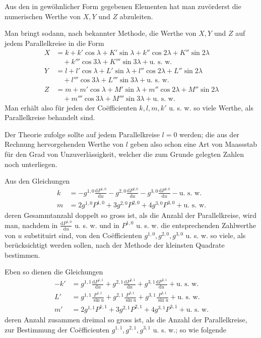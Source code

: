 Aus den in gewöhnlicher Form gegebenen Elementen hat man zuvörderst die numerischen Werthe von $X,Y$ und $Z$ abzuleiten.

Man bringt sodann, nach bekannter Methode, die Werthe von $X,Y$ und $Z$ auf jedem Parallelkreise in die Form
\[
\begin{aligned}
X&=k+k'\cos\lambda+K'\sin\lambda+k''\cos2\lambda+K''\sin2\lambda\\&\quad+k'''\cos3\lambda+K'''\sin3\lambda+\text{u. s. w.}\\
Y&=l+l'\cos\lambda+L'\sin\lambda+l''\cos2\lambda+L''\sin2\lambda\\&\quad+l'''\cos3\lambda+L'''\sin3\lambda+\text{u. s. w.}\\
Z&=m+m'\cos\lambda+M'\sin\lambda+m''\cos2\lambda+M''\sin2\lambda\\&\quad+m'''\cos3\lambda+M'''\sin3\lambda+\text{u. s. w.}
\end{aligned}
\]
Man erhält also für jeden der Coëfficienten $k,l,m,k'$ u. s. w. so viele Werthe, als Parallelkreise behandelt sind.

Der Theorie zufolge sollte auf jedem Parallelkreise $l=0$ werden; die aus der Rechnung hervorgehenden Werthe von $l$ geben also schon eine Art von Maassstab für den Grad von Unzuverlässigkeit, welcher die zum Grunde gelegten Zahlen noch unterliegen.

Aus den Gleichungen
\[
\begin{aligned}
k&=-g^{1,0}\frac{\mathrm{d}P^{1,0}}{\mathrm{d}u}-g^{2,0}\frac{\mathrm{d}P^{2,0}}{\mathrm{d}u}-g^{3,0}\frac{\mathrm{d}P^{3,0}}{\mathrm{d}u}-\text{u. s. w.}\\
m&=2g^{1,0}P^{1,0}+3g^{2,0}P^{2,0}+4g^{3,0}P^{3,0}+\text{u. s. w.}
\end{aligned}
\]
deren Gesammtanzahl doppelt so gross ist, als die Anzahl der Parallelkreise, wird man, nachdem in $\frac{\mathrm{d}P^{1,0}}{\mathrm{d}u}$ u. s. w. und in $P^{1,0}$ u. s. w. die entsprechenden Zahlwerthe von $u$ substituirt sind, von den Coëfficienten $g^{1,0},g^{2,0},g^{3,0}$ u. s. w. so viele, als berücksichtigt werden sollen, nach der Methode der kleinsten Quadrate bestimmen.

Eben so dienen die Gleichungen
\[
\begin{aligned}
-k'&=g^{1,1}\frac{\mathrm{d}P^{1,1}}{\mathrm{d}u}+g^{2,1}\frac{\mathrm{d}P^{2,1}}{\mathrm{d}u}+g^{3,1}\frac{\mathrm{d}P^{3,1}}{\mathrm{d}u}+\text{u. s. w.}\\
L'&=g^{1,1}\frac{P^{1,1}}{\sin u}+g^{2,1}\frac{P^{2,1}}{\sin u}+g^{3,1}\frac{P^{3,1}}{\sin u}+\text{u. s. w.}\\
m'&=2g^{1,1}P^{1,1}+3g^{2,1}P^{2,1}+4g^{3,1}P^{3,1}+\text{u. s. w.}
\end{aligned}
\]
deren Anzahl zusammen dreimal so gross ist, als die Anzahl der Parallelkreise, zur Bestimmung der Coëfficienten $g^{1,1},g^{2,1},g^{3,1}$ u. s. w.; so wie folgende
\par\GaussVTheoryGathering{19\textsuperscript{*}}
